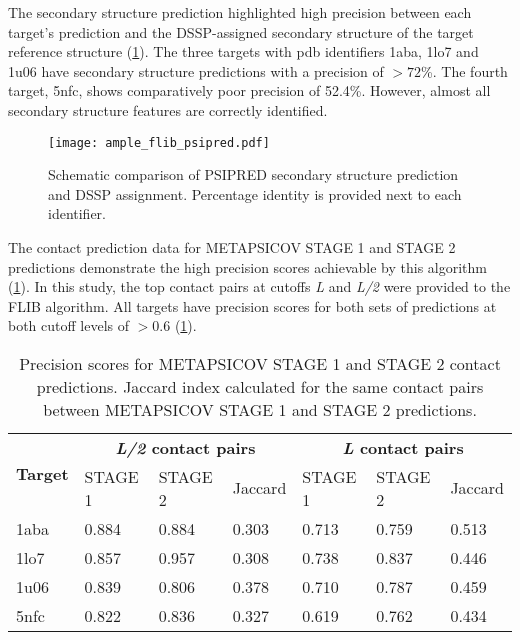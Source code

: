 The secondary structure prediction highlighted high precision between each target's prediction and the DSSP-assigned \cite{Frishman1995-ns} secondary structure of the target reference structure (\cref{fig:ample_flib_psipred}). The three targets with \gls{pdb} identifiers 1aba, 1lo7 and 1u06 have secondary structure predictions with a precision of $>72$\%. The fourth target, 5nfc, shows comparatively poor precision of 52.4\%. However, almost all secondary structure features are correctly identified.

\begin{figure}[H]
	\centering
	\texttt{[image: ample\_flib\_psipred.pdf]}
	\caption[PSIPRED schema for FLIB targets]{Schematic comparison of PSIPRED \cite{Jones1999-fi} secondary structure prediction and DSSP \cite{Frishman1995-ns} assignment. Percentage identity is provided next to each identifier.}
	\label{fig:ample_flib_psipred}
\end{figure}

The contact prediction data for METAPSICOV STAGE 1 and STAGE 2 predictions demonstrate the high precision scores achievable by this algorithm (\cref{table:ample_flib_contact_precision}). In this study, the top contact pairs at cutoffs \textit{L} and \textit{L/2} were provided to the FLIB algorithm. All targets have precision scores for both sets of predictions at both cutoff levels of $>0.6$ (\cref{table:ample_flib_contact_precision}).

\begin{table}[H]
  \centering
  \caption[Contact prediction summary for FLIB targets]{Precision scores for METAPSICOV \cite{Jones2015-wp} STAGE 1 and STAGE 2 contact predictions. Jaccard index calculated for the same contact pairs between METAPSICOV STAGE 1 and STAGE 2 predictions.}
  \label{table:ample_flib_contact_precision}
  \begin{tabularx}{\textwidth}{X X X X X X X}
      \hline
	  \multirow{2}{*}{\textbf{Target}} & \multicolumn{3}{c}{\textbf{\textit{L/2} contact pairs}} & \multicolumn{3}{c}{\textbf{\textit{L} contact pairs}} 	\\ \cline{2-7}
	  							&  	STAGE 1	& 	STAGE 2	& 	Jaccard 	& 	STAGE 1 	& 	STAGE 2 	& 	Jaccard	 	\\
	  \hline
	  1aba						&	0.884	&	0.884	&	0.303	&	0.713	&	0.759	&	0.513		\\
	  1lo7						&	0.857	&	0.957	&	0.308	&	0.738	&	0.837	&	0.446		\\
	  1u06						&	0.839	&	0.806	&	0.378	&	0.710	&	0.787	&	0.459		\\
	  5nfc						&	0.822	&	0.836	&	0.327	&	0.619	&	0.762	&	0.434		\\ 
	  \hline
  \end{tabularx}
\end{table}


